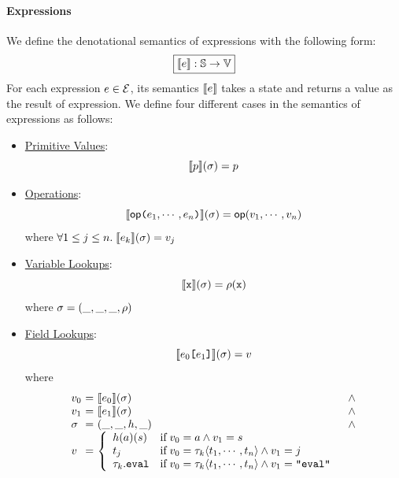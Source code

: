 \paragraph{Expressions} We define the denotational semantics of expressions with
the following form:
\[
  \framebox{$\sem{\expr}: \stset \rightarrow \valset$}
\]
For each expression $e \in \mathcal{E}$, its semantics $\llbracket{e}\rrbracket$ takes a
state and returns a value as the result of expression. We define four different
cases in the semantics of expressions as
follows:
\begin{itemize}
  \item \underline{Primitive Values}:
    \[
      \llbracket{p}\rrbracket(\sigma) = p
    \]

  \item \underline{Operations}:
    \[
      \llbracket{\textsf{op}\texttt{(}e_1, \cdots, e_n \texttt{)}}\rrbracket(\sigma) =
      \textsf{op}(v_1, \cdots, v_n)
    \]
    where $\forall 1 \leq j \leq n. \; \llbracket{e_k}\rrbracket(\sigma) = v_j$

  \item \underline{Variable Lookups}:
    \[
      \llbracket{\texttt{x}}\rrbracket(\sigma) = \rho(\texttt{x})
    \]
    where $\sigma = (\_, \_, \_, \rho)$

  \item \underline{Field Lookups}:
    \[
      \llbracket{e_0 \texttt{[}e_1 \texttt{]}}\rrbracket(\sigma) = v
    \]
    where
    \[
      \begin{array}{l@{~}c@{~}ll}
        \val_0 &=& \sem{\expr_0}(\st) &\wedge\\
        \val_1 &=& \sem{\expr_1}(\st) &\wedge\\
        \st &=& (\_, \_, \heap, \_) &\wedge\\
        \val &=& \left\{
          \begin{array}{ll}
            \heap(\addr)(\str)
            & \text{if} \; \val_0 = \addr \wedge \val_1 = \str\\

            \tree_j
            & \text{if} \; \val_0 = \ty_k \langle \tree_1, \cdots, \tree_n
            \rangle \wedge \val_1 = j\\

            \ty_k.\eval
            & \text{if} \; \val_0 = \ty_k \langle \tree_1, \cdots, \tree_n
            \rangle \wedge \val_1 = \code{"eval"}\\
          \end{array}
        \right.\\
      \end{array}
    \]
\end{itemize}

